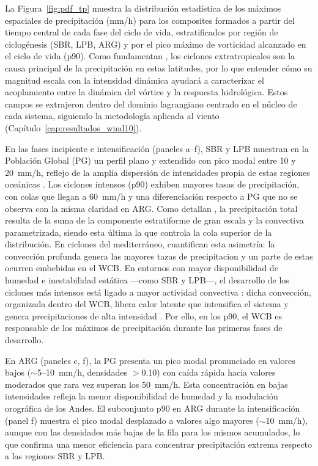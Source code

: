 La Figura~\ref{fig:pdf_tp} muestra la distribución estadística de los máximos espaciales de precipitación (mm/h) para los composites formados a partir del tiempo central de cada fase del ciclo de vida, estratificados por región de ciclogénesis (SBR, LPB, ARG) y por el pico máximo de vorticidad alcanzado en el ciclo de vida (p90).
Como fundamentan \citet{sinclair2023relationship}, los ciclones extratropicales son la causa principal de la precipitación en estas latitudes, por lo que entender cómo su magnitud escala con la intensidad dinámica ayudará a caracterizar el acoplamiento entre la dinámica del vórtice y la respuesta hidrológica.
Estos campos se extrajeron dentro del dominio lagrangiano centrado en el núcleo de cada sistema, siguiendo la metodología aplicada al viento (Capítulo~\ref{cap:resultados_wind10}).

En las fases incipiente e intensificación (paneles a--f), SBR y LPB muestran en la Población Global (PG) un perfil plano y extendido con pico modal entre 10 y 20~mm/h, reflejo de la amplia dispersión de intensidades propia de estas regiones oceánicas \citep{evans2012climatology}.
Los ciclones intensos (p90) exhiben mayores tasas de precipitación, con colas que llegan a 60~mm/h y una diferenciación respecto a PG que no se observa con la misma claridad en ARG.
Como detallan \citet{chen2024evaluation}, la precipitación total resulta de la suma de la componente estratiforme de gran escala y la convectiva parametrizada, siendo esta última la que controla la cola superior de la distribución.
En ciclones del mediterráneo, \citet{flaounas2018heavy} cuantifican esta asimetría: la convección profunda genera las mayores tazas de precipitacion y un parte de estas ocurren embebidas en el WCB.
En entornos con mayor disponibilidad de humedad e inestabilidad estática —como SBR y LPB—, el desarrollo de los ciclones más intensos está ligado a mayor actividad convectiva \citep{sinclair2023relationship}: dicha convección, organizada dentro del WCB, libera calor latente que intensifica el sistema \citep{blanchard2021warm} y genera precipitaciones de alta intensidad \citep{oertel2021warm}. Por ello, en los p90, el WCB es responsable de los máximos de precipitación durante las primeras fases de desarrollo.

En ARG (paneles c, f), la PG presenta un pico modal pronunciado en valores bajos ($\sim$5--10~mm/h, densidades $>$0.10) con caída rápida hacia valores moderados que rara vez superan los 50~mm/h. 
Esta concentración en bajas intensidades refleja la menor disponibilidad de humedad y la modulación orográfica de los Andes. 
El subconjunto p90 en ARG durante la intensificación (panel f) muestra el pico modal desplazado a valores algo mayores ($\sim$10~mm/h), aunque con las densidades más bajas de la fila para los mismos acumulados, lo que confirma una menor eficiencia para concentrar precipitación extrema respecto a las regiones SBR y LPB.

